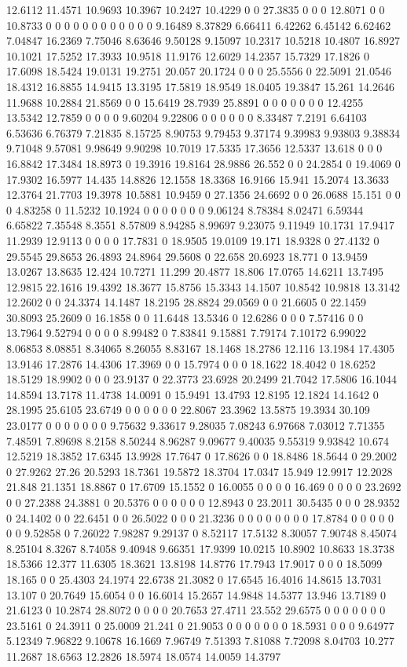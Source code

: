12.6112 11.4571 10.9693 10.3967 10.2427 10.4229 0 0 27.3835 0 0 0 12.8071 0 0 10.8733 0 0 0 0 0 0 0 0 0 0 0 0 9.16489 8.37829 6.66411 6.42262 6.45142 6.62462 7.04847 16.2369 7.75046 8.63646 9.50128 9.15097 10.2317 10.5218 10.4807 16.8927 10.1021 17.5252 17.3933 10.9518 11.9176 12.6029 14.2357 15.7329 17.1826 0 17.6098 18.5424 19.0131 19.2751 20.057 20.1724 0 0 0 25.5556 0 22.5091 21.0546 18.4312 16.8855 14.9415 13.3195 17.5819 18.9549 18.0405 19.3847 15.261 14.2646 11.9688 10.2884 21.8569 0 0 15.6419 28.7939 25.8891 0 0 0 0 0 0 0 12.4255 13.5342 12.7859 0 0 0 0 9.60204 9.22806 0 0 0 0 0 0 8.33487 7.2191 6.64103 6.53636 6.76379 7.21835 8.15725 8.90753 9.79453 9.37174 9.39983 9.93803 9.38834 9.71048 9.57081 9.98649 9.90298 10.7019 17.5335 17.3656 12.5337 13.618 0 0 0 16.8842 17.3484 18.8973 0 19.3916 19.8164 28.9886 26.552 0 0 24.2854 0 19.4069 0 17.9302 16.5977 14.435 14.8826 12.1558 18.3368 16.9166 15.941 15.2074 13.3633 12.3764 21.7703 19.3978 10.5881 10.9459 0 27.1356 24.6692 0 0 26.0688 15.151 0 0 0 4.83258 0 11.5232 10.1924 0 0 0 0 0 0 0 9.06124 8.78384 8.02471 6.59344 6.65822 7.35548 8.3551 8.57809 8.94285 8.99697 9.23075 9.11949 10.1731 17.9417 11.2939 12.9113 0 0 0 0 17.7831 0 18.9505 19.0109 19.171 18.9328 0 27.4132 0 29.5545 29.8653 26.4893 24.8964 29.5608 0 22.658 20.6923 18.771 0 13.9459 13.0267 13.8635 12.424 10.7271 11.299 20.4877 18.806 17.0765 14.6211 13.7495 12.9815 22.1616 19.4392 18.3677 15.8756 15.3343 14.1507 10.8542 10.9818 13.3142 12.2602 0 0 24.3374 14.1487 18.2195 28.8824 29.0569 0 0 21.6605 0 22.1459 30.8093 25.2609 0 16.1858 0 0 11.6448 13.5346 0 12.6286 0 0 0 7.57416 0 0 13.7964 9.52794 0 0 0 0 8.99482 0 7.83841 9.15881 7.79174 7.10172 6.99022 8.06853 8.08851 8.34065 8.26055 8.83167 18.1468 18.2786 12.116 13.1984 17.4305 13.9146 17.2876 14.4306 17.3969 0 0 15.7974 0 0 0 18.1622 18.4042 0 18.6252 18.5129 18.9902 0 0 0 23.9137 0 22.3773 23.6928 20.2499 21.7042 17.5806 16.1044 14.8594 13.7178 11.4738 14.0091 0 15.9491 13.4793 12.8195 12.1824 14.1642 0 28.1995 25.6105 23.6749 0 0 0 0 0 0 22.8067 23.3962 13.5875 19.3934 30.109 23.0177 0 0 0 0 0 0 0 9.75632 9.33617 9.28035 7.08243 6.97668 7.03012 7.71355 7.48591 7.89698 8.2158 8.50244 8.96287 9.09677 9.40035 9.55319 9.93842 10.674 12.5219 18.3852 17.6345 13.9928 17.7647 0 17.8626 0 0 18.8486 18.5644 0 29.2002 0 27.9262 27.26 20.5293 18.7361 19.5872 18.3704 17.0347 15.949 12.9917 12.2028 21.848 21.1351 18.8867 0 17.6709 15.1552 0 16.0055 0 0 0 0 16.469 0 0 0 0 23.2692 0 0 27.2388 24.3881 0 20.5376 0 0 0 0 0 0 12.8943 0 23.2011 30.5435 0 0 0 28.9352 0 24.1402 0 0 22.6451 0 0 26.5022 0 0 0 21.3236 0 0 0 0 0 0 0 0 17.8784 0 0 0 0 0 0 0 9.52858 0 7.26022 7.98287 9.29137 0 8.52117 17.5132 8.30057 7.90748 8.45074 8.25104 8.3267 8.74058 9.40948 9.66351 17.9399 10.0215 10.8902 10.8633 18.3738 18.5366 12.377 11.6305 18.3621 13.8198 14.8776 17.7943 17.9017 0 0 0 18.5099 18.165 0 0 25.4303 24.1974 22.6738 21.3082 0 17.6545 16.4016 14.8615 13.7031 13.107 0 20.7649 15.6054 0 0 16.6014 15.2657 14.9848 14.5377 13.946 13.7189 0 21.6123 0 10.2874 28.8072 0 0 0 0 20.7653 27.4711 23.552 29.6575 0 0 0 0 0 0 0 23.5161 0 24.3911 0 25.0009 21.241 0 21.9053 0 0 0 0 0 0 0 18.5931 0 0 0 9.64977 5.12349 7.96822 9.10678 16.1669 7.96749 7.51393 7.81088 7.72098 8.04703 10.277 11.2687 18.6563 12.2826 18.5974 18.0574 14.0059 14.3797 
